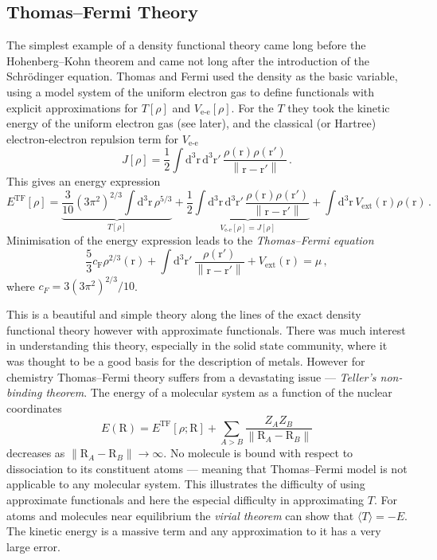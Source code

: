 \documentclass{article}
\theoremstyle{plain}\theoremheaderfont{\normalfont\itshape}\theorembodyfont{\rmfamily}\theoremseparator{.}\newtheorem*{rem}{Remark}\newtheorem*{ex}{Example}\newtheorem*{proof}{Proof}\newtheorem*{altp}{Alternative proof}
\theoremstyle{plain}\theoremheaderfont{\normalfont\bfseries}\theorembodyfont{\rmfamily}\theoremseparator{.}\newtheorem{thm}{Theorem}[section]\newtheorem{lem}[thm]{Lemma}\newtheorem{prop}[thm]{Proposition}\newtheorem*{cor}{Corollary}\newtheorem{defn}[thm]{Definition}\newtheorem{clm}[thm]{Claim}\newtheorem{clminproof}{Claim}
\theoremstyle{break}\theoremheaderfont{\normalfont\itshape}\theorembodyfont{\rmfamily}\theoremseparator{.\medskip}\newtheorem*{proofskip}{Proof}\newtheorem*{exs}{Examples}\newtheorem*{rems}{Remarks}
\theoremstyle{break}\theoremheaderfont{\normalfont\bfseries}\theorembodyfont{\rmfamily}\theoremseparator{.\medskip}\newtheorem{lemskip}[thm]{Lemma}\newtheorem{defnskip}[thm]{Definition}\newtheorem{propskip}[thm]{Proposition}\newtheorem{thmskip}[thm]{Theorem}
\numberwithin{equation}{section}
\newcommand{\dd}[2][]{\mathrm{d}^{#1} #2\,}
\newcommand{\vb}[1]{\bm{\mathrm{#1}}}
\newcommand{\norm}[1]{\left\| #1 \right\|}
\newcommand{\ext}{_{\text{ext}}}
\newcommand{\ee}{_{\text{e-e}}}
\begin{document}
    \subsection{Thomas--Fermi Theory}
    The simplest example of a density functional theory came long before the Hohenberg--Kohn theorem and came not long after the introduction of the Schr\"{o}dinger equation. Thomas and Fermi used the density as the basic variable, using a model system of the uniform electron gas to define functionals with explicit approximations for \(T[\rho]\) and \(V\ee[\rho]\). For the \(T\) they took the kinetic energy of the uniform electron gas (see later), and the classical (or Hartree) electron-electron repulsion term for \(V\ee\)
    \begin{equation}
        J[\rho]=\frac{1}{2}\int\dd[3]{\vb{r}}\dd[3]{\vb{r}'}\frac{\rho(\vb{r})\rho(\vb{r}')}{\norm{\vb{r}-\vb{r}'}}\,.
    \end{equation}
    This gives an energy expression
    \begin{equation}
        E^{\text{TF}}[\rho]=\underbrace{\frac{3}{10}(3\pi^2)^{2/3}\int\dd[3]{\vb{r}}\rho^{5/3}}_{T[\rho]}+\underbrace{\frac{1}{2}\int\dd[3]{\vb{r}}\dd[3]{\vb{r}'}\frac{\rho(\vb{r})\rho(\vb{r}')}{\norm{\vb{r}-\vb{r}'}}}_{V\ee[\rho]=J[\rho]}+\int\dd[3]{\vb{r}}V\ext(\vb{r})\rho(\vb{r})\,.
    \end{equation}
    Minimisation of the energy expression leads to the \textit{Thomas--Fermi equation}
    \begin{equation}
        \frac{5}{3}c_{\text{F}}\rho^{2/3}(\vb{r})+\int\dd[3]{\vb{r}'}\frac{\rho(\vb{r}')}{\norm{\vb{r}-\vb{r}'}}+V\ext(\vb{r})=\mu\,,
    \end{equation}
    where \(c_F=3(3\pi^2)^{2/3}/10\).

    This is a beautiful and simple theory along the lines of the exact density functional theory however with approximate functionals. There was much  interest in understanding this theory, especially in the solid state community, where it was thought to be a good basis for the description of metals. However for chemistry Thomas--Fermi theory suffers from a devastating issue --- \textit{Teller's non-binding theorem}. The energy of a molecular system as a function of the nuclear coordinates
    \begin{equation}
        E(\vb{R})=E^{\text{TF}}[\rho;\vb{R}]+\sum_{A>B}\frac{Z_AZ_B}{\norm{\vb{R}_A-\vb{R}_B}}
    \end{equation}
    decreases as \(\norm{\vb{R}_A-\vb{R}_B}\to\infty\). No molecule is bound with respect to dissociation to its constituent atoms --- meaning that Thomas--Fermi model is not applicable to any molecular system. This illustrates the difficulty of using approximate functionals and here the especial difficulty in approximating \(T\). For atoms and molecules near equilibrium the \textit{virial theorem} can show that \(\langle T\rangle=-E\). The kinetic energy is a massive term and any approximation to it has a very large error.
\end{document}
